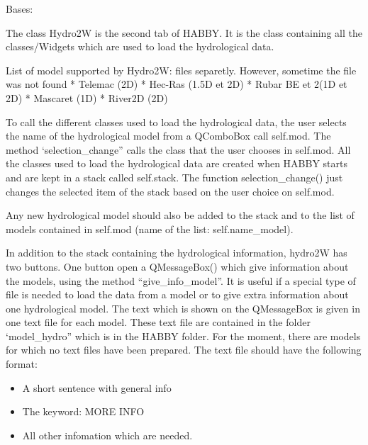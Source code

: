 \documentclass[letterpaper,10pt,english]{sphinxmanual}
\begin{document}

\begin{fulllineitems}
\label{\detokenize{index:src_GUI.hydro_GUI_2.Hydro2W}}
Bases: 

The class Hydro2W is the second tab of HABBY. It is the class containing all the classes/Widgets which are used
to load the hydrological data.

List of model supported by Hydro2W:
files separetly. However, sometime the file was not found
*   Telemac (2D)
*   Hec-Ras (1.5D et 2D)
*   Rubar BE et 2(1D et 2D)
*   Mascaret (1D)
*   River2D (2D)


To call the different classes used to load the hydrological data, the user selects the name of the hydrological
model from a QComboBox call self.mod. The method ‘selection\_change” calls the class that the user chooses in
self.mod. All the classes used to load the
hydrological data are created when HABBY starts and are kept in a stack called self.stack. The function
selection\_change() just changes the selected item of the stack based on the user choice on self.mod.

Any new hydrological model should also be added to the stack and to the list of models contained in self.mod
(name of the list: self.name\_model).

In addition to the stack containing the hydrological information, hydro2W has two buttons. One button open
a QMessageBox() which give information about the models, using the method “give\_info\_model”.  It is useful if a
special type of file is needed to load the data from a model or to give extra information about one hydrological
model. The text which is shown on the QMessageBox is given in one text file for each model.
These text file are contained in the folder ‘model\_hydro” which is in the HABBY folder. For the moment,
there are models for which no text files have been prepared. The text file should have the following format:
\begin{itemize}
\item {} 
A short sentence with general info

\item {} 
The keyword:  MORE INFO

\item {} 
All other infomation which are needed.


\end{itemize}
\end{fulllineitems}
\end{document}
